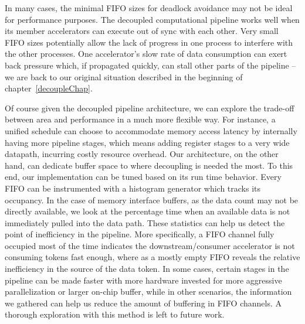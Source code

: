 In many cases, the minimal FIFO sizes for deadlock avoidance may not be ideal for performance purposes. The decoupled computational pipeline works well when its member accelerators
can execute out of sync with each other. Very small FIFO sizes potentially allow the lack of progress in one process to interfere with the other processes. 
One accelerator's slow rate of data consumption can exert back pressure which, if propagated quickly, can stall other parts of the pipeline -- we are back to our original situation described in the beginning of chapter~\ref{decoupleChap}.

Of course given the decoupled pipeline architecture, we can explore the trade-off
between area and performance in a much more flexible way. For instance, a unified schedule can choose to accommodate memory access latency by internally having more pipeline stages, which means adding register stages to a very wide datapath, incurring costly resource overhead. Our architecture, on the other hand, can dedicate buffer space to where 
decoupling is needed the most. To this end, %
our implementation can be tuned based on its run time behavior. 
Every FIFO can be instrumented with a histogram generator
which tracks its occupancy. 
In the case of 
memory interface buffers, as the data count may not be directly available, we look at the percentage time when an available data is not immediately pulled into the data path. These statistics can help us detect the
point of inefficiency in the pipeline. More specifically, a FIFO channel fully occupied most of
the time indicates the downstream/consumer accelerator
is not consuming tokens fast enough, where as a mostly empty FIFO reveals the relative inefficiency in the source of the data token. In some cases, certain stages in the pipeline can be made faster with more hardware invested for more aggressive parallelization or larger on-chip buffer, while in other scenarios, the information we gathered can help us
reduce the amount of buffering in FIFO channels. A thorough exploration with this method is left to future work.


